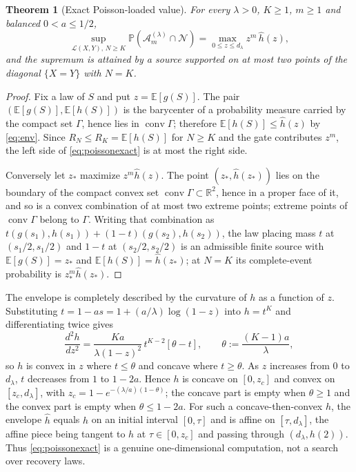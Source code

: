 \documentclass[11pt]{article}
\newtheorem{theorem}{Theorem}[section]
\theoremstyle{remark}\newtheorem{remark}[theorem]{Remark}
\newcommand{\E}{\mathbb E}
\newcommand{\Prob}{\mathbb P}
\newcommand{\Neg}{\mathcal N}
\begin{document}
\begin{theorem}[Exact Poisson-loaded value]\label{thm:poissonexact}
For every $\lambda>0$, $K\ge1$, $m\ge1$ and balanced $0<a\le1/2$,
\begin{equation}\label{eq:poissonexact}
\sup_{\mathcal L(X,Y),\,N\ge K}\Prob(\mathcal A_m^{(\lambda)}\cap\Neg)
=\max_{0\le z\le d_\lambda}z^m\,\hat h(z),
\end{equation}
and the supremum is attained by a source supported on at most two points of the
diagonal $\{X=Y\}$ with $N=K$.
\end{theorem}
\begin{proof}
Fix a law of $S$ and put $z=\E[g(S)]$. The pair $(\E[g(S)],\E[h(S)])$ is the
barycenter of a probability measure carried by the compact set $\Gamma$, hence
lies in $\operatorname{conv}\Gamma$; therefore $\E[h(S)]\le\hat h(z)$ by
\eqref{eq:env}. Since $R_N\le R_K=\E[h(S)]$ for $N\ge K$ and the gate
contributes $z^m$, the left side of \eqref{eq:poissonexact} is at most the right
side.

Conversely let $z_*$ maximize $z^m\hat h(z)$. The point $(z_*,\hat h(z_*))$ lies
on the boundary of the compact convex set $\operatorname{conv}\Gamma\subset
\mathbb R^2$, hence in a proper face of it, and so is a convex combination of at
most two extreme points; extreme points of $\operatorname{conv}\Gamma$ belong to
$\Gamma$. Writing that combination as $t(g(s_1),h(s_1))+(1-t)(g(s_2),h(s_2))$,
the law placing mass $t$ at $(s_1/2,s_1/2)$ and $1-t$ at $(s_2/2,s_2/2)$ is an
admissible finite source with $\E[g(S)]=z_*$ and $\E[h(S)]=\hat h(z_*)$; at
$N=K$ its complete-event probability is $z_*^m\hat h(z_*)$.
\end{proof}

The envelope is completely described by the curvature of $h$ as a function of
$z$. Substituting $t=1-as=1+(a/\lambda)\log(1-z)$ into $h=t^K$ and
differentiating twice gives
\begin{equation}\label{eq:curv}
\frac{d^2h}{dz^2}=\frac{Ka}{\lambda(1-z)^2}\,t^{K-2}
\left[\theta-t\right],\qquad \theta:=\frac{(K-1)a}{\lambda},
\end{equation}
so $h$ is convex in $z$ where $t\le\theta$ and concave where $t\ge\theta$. As $z$
increases from $0$ to $d_\lambda$, $t$ decreases from $1$ to $1-2a$. Hence $h$ is
concave on $[0,z_c]$ and convex on $[z_c,d_\lambda]$, with
$z_c=1-e^{-(\lambda/a)(1-\theta)}$; the concave part is empty when $\theta\ge1$
and the convex part is empty when $\theta\le1-2a$. For such a
concave-then-convex $h$, the envelope $\hat h$ equals $h$ on an initial interval
$[0,\tau]$ and is affine on $[\tau,d_\lambda]$, the affine piece being tangent to
$h$ at $\tau\in[0,z_c]$ and passing through $(d_\lambda,h(2))$. Thus
\eqref{eq:poissonexact} is a genuine one-dimensional computation, not a search
over recovery laws.
\end{document}
